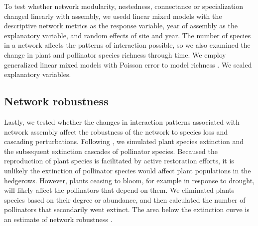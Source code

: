 \documentclass[12pt]{article}
\begin{document}
To test whether network modularity, nestedness, connectance or
specialization changed linearly with assembly, we usedd linear mixed
models with the descriptive network metrics as the response variable,
year of assembly as the explanatory variable, and random effects of
site and year. The number of species in a network affects the patterns
of interaction possible, so we also examined the change in plant and
pollinator species richness through time. We employ generalized linear
mixed models with Poisson error to model richness \citep{lme4}. We
scaled explanatory variables.


\subsection*{Network robustness}
Lastly, we tested whether the changes in interaction patterns
associated with network assembly affect the robustness of the network
to species loss and cascading perturbations. Following
\cite{Memmott2004}, we simulated plant species extinction and the
subsequent extinction cascades of pollinator species. Becaused the
reproduction of plant species is facilitated by active restoration
efforts, it is unlikely the extinction of pollinator species would
affect plant populations in the hedgerows. However, plants ceasing to
bloom, for example in response to drought, will likely affect the
pollinators that depend on them. We eliminated plants species based on
their degree or abundance, and then calculated the number of
pollinators that secondarily went extinct. The area below the
extinction curve is an estimate of network robustness
\citep{Memmott2004, bipartite}.
\end{document}
